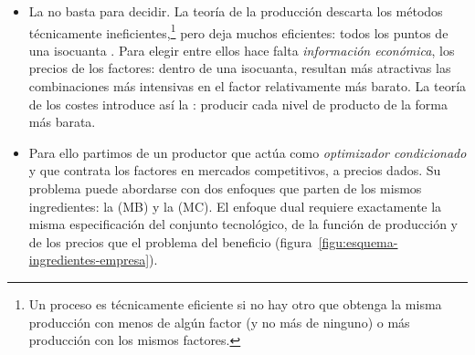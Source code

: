 \documentclass[11pt]{article}
\begin{document}
\begin{itemize}
\item La  no basta para decidir. La teoría de la producción descarta los métodos técnicamente ineficientes,\footnote{Un proceso es técnicamente eficiente si no hay otro que obtenga la misma producción con menos de algún factor (y no más de ninguno) o más producción con los mismos factores.} pero deja muchos eficientes: todos los puntos de una isocuanta . Para elegir entre ellos hace falta \emph{información económica}, los precios de los factores: dentro de una isocuanta, resultan más atractivas las combinaciones más intensivas en el factor relativamente más barato. La teoría de los costes introduce así la : producir cada nivel de producto de la forma más barata.
\item Para ello partimos de un productor que actúa como \emph{optimizador condicionado} y que contrata los factores en mercados competitivos, a precios dados. Su problema puede abordarse con dos enfoques que parten de los mismos ingredientes: la  (MB) y la  (MC). El enfoque dual requiere exactamente la misma especificación del conjunto tecnológico, de la función de producción y de los precios que el problema del beneficio (figura~\ref{figu:esquema-ingredientes-empresa}).
\end{itemize}

\begin{infografia}[H]
\centering
\caption{De la tecnología a las demandas de factores: los mismos ingredientes, con los papeles cambiados}\label{figu:esquema-ingredientes-empresa}
\end{infografia}
\end{document}
